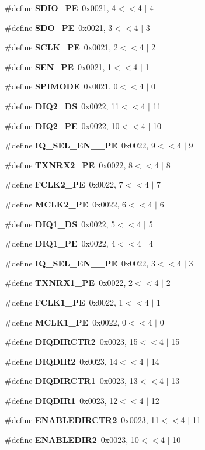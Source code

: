 \begin{DoxyCompactItemize}
\item 
\#define {\bf S\+D\+I\+O\+\_\+\+PE}~0x0021, 4$<$$<$4 $\vert$  4
\item 
\#define {\bf S\+D\+O\+\_\+\+PE}~0x0021, 3$<$$<$4 $\vert$  3
\item 
\#define {\bf S\+C\+L\+K\+\_\+\+PE}~0x0021, 2$<$$<$4 $\vert$  2
\item 
\#define {\bf S\+E\+N\+\_\+\+PE}~0x0021, 1$<$$<$4 $\vert$  1
\item 
\#define {\bf S\+P\+I\+M\+O\+DE}~0x0021, 0$<$$<$4 $\vert$  0
\item 
\#define {\bf D\+I\+Q2\+\_\+\+DS}~0x0022, 11$<$$<$4 $\vert$  11
\item 
\#define {\bf D\+I\+Q2\+\_\+\+PE}~0x0022, 10$<$$<$4 $\vert$  10
\item 
\#define {\bf I\+Q\+\_\+\+S\+E\+L\+\_\+\+E\+N\+\_\+\_\+\+PE}~0x0022, 9$<$$<$4 $\vert$  9
\item 
\#define {\bf T\+X\+N\+R\+X2\+\_\+\+PE}~0x0022, 8$<$$<$4 $\vert$  8
\item 
\#define {\bf F\+C\+L\+K2\+\_\+\+PE}~0x0022, 7$<$$<$4 $\vert$  7
\item 
\#define {\bf M\+C\+L\+K2\+\_\+\+PE}~0x0022, 6$<$$<$4 $\vert$  6
\item 
\#define {\bf D\+I\+Q1\+\_\+\+DS}~0x0022, 5$<$$<$4 $\vert$  5
\item 
\#define {\bf D\+I\+Q1\+\_\+\+PE}~0x0022, 4$<$$<$4 $\vert$  4
\item 
\#define {\bf I\+Q\+\_\+\+S\+E\+L\+\_\+\+E\+N\+\_\+\_\+\+PE}~0x0022, 3$<$$<$4 $\vert$  3
\item 
\#define {\bf T\+X\+N\+R\+X1\+\_\+\+PE}~0x0022, 2$<$$<$4 $\vert$  2
\item 
\#define {\bf F\+C\+L\+K1\+\_\+\+PE}~0x0022, 1$<$$<$4 $\vert$  1
\item 
\#define {\bf M\+C\+L\+K1\+\_\+\+PE}~0x0022, 0$<$$<$4 $\vert$  0
\item 
\#define {\bf D\+I\+Q\+D\+I\+R\+C\+T\+R2}~0x0023, 15$<$$<$4 $\vert$  15
\item 
\#define {\bf D\+I\+Q\+D\+I\+R2}~0x0023, 14$<$$<$4 $\vert$  14
\item 
\#define {\bf D\+I\+Q\+D\+I\+R\+C\+T\+R1}~0x0023, 13$<$$<$4 $\vert$  13
\item 
\#define {\bf D\+I\+Q\+D\+I\+R1}~0x0023, 12$<$$<$4 $\vert$  12
\item 
\#define {\bf E\+N\+A\+B\+L\+E\+D\+I\+R\+C\+T\+R2}~0x0023, 11$<$$<$4 $\vert$  11
\item 
\#define {\bf E\+N\+A\+B\+L\+E\+D\+I\+R2}~0x0023, 10$<$$<$4 $\vert$  10
$$
\end{DoxyCompactItemize}
